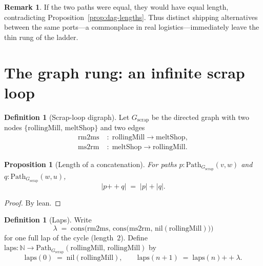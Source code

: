 \documentclass[11pt,a4paper]{article}
\theoremstyle{plain}
\newtheorem{proposition}[theorem]{Proposition}
\theoremstyle{definition}
\newtheorem{definition}[theorem]{Definition}
\newtheorem{remark}[theorem]{Remark}
\newcommand{\N}{\mathbb{N}}
\begin{document}
\begin{remark}
If the two paths were equal, they would have equal length, contradicting
Proposition~\ref{prop:dag-lengths}. Thus distinct shipping alternatives between
the same ports---a commonplace in real logistics---immediately leave the thin
rung of the ladder.
\end{remark}

\section{The graph rung: an infinite scrap loop}

\begin{definition}[Scrap-loop digraph]\label{def:scrap}
Let $G_{\mathrm{scrap}}$ be the directed graph with two nodes
$\{\mathrm{rollingMill},\, \mathrm{meltShop}\}$ and two edges
\begin{align*}
  \mathrm{rm2ms} &\;:\; \mathrm{rollingMill} \to \mathrm{meltShop}, \\
  \mathrm{ms2rm} &\;:\; \mathrm{meltShop} \to \mathrm{rollingMill}.
\end{align*}
\end{definition}

\begin{proposition}[Length of a concatenation]\label{prop:len-append}
For paths $p : \mathrm{Path}_{G_{\mathrm{scrap}}}(v,w)$ and
$q : \mathrm{Path}_{G_{\mathrm{scrap}}}(w,u)$,
\[
  \lvert p \mathbin{{+}{+}} q\rvert \;=\; \lvert p\rvert + \lvert q\rvert.
\]
\end{proposition}

\begin{proof}
By lean.
\end{proof}

\begin{definition}[Laps]\label{def:laps}
Write
\begin{equation}
  \lambda
  \;=\;
  \mathrm{cons}\bigl(\mathrm{rm2ms},\,
    \mathrm{cons}\bigl(\mathrm{ms2rm},\,
      \mathrm{nil}(\mathrm{rollingMill})\bigr)\bigr)
\end{equation}
for one full lap of the cycle (length~$2$). Define
$\mathrm{laps} : \N \to \mathrm{Path}_{G_{\mathrm{scrap}}}
(\mathrm{rollingMill},\, \mathrm{rollingMill})$ by
\begin{equation}
  \mathrm{laps}(0) \;=\; \mathrm{nil}(\mathrm{rollingMill}),
  \qquad
  \mathrm{laps}(n+1) \;=\; \mathrm{laps}(n) \mathbin{{+}{+}} \lambda.
\end{equation}
\end{definition}
\end{document}
